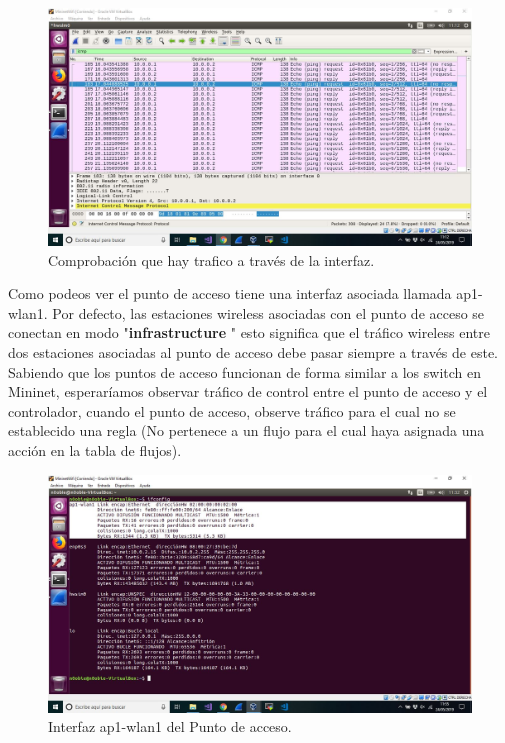 \begin{figure}[!htb]
  \centering
    \includegraphics[width=\linewidth]{./img/test/5.JPG}
    \caption{Comprobación que hay trafico a través de la interfaz.}
  \label{fig:yo}
\end{figure}

Como podeos ver el punto de acceso tiene una interfaz asociada llamada ap1-wlan1. Por defecto, las estaciones wireless asociadas con el punto de acceso se conectan en modo "\textbf{infrastructure} " esto significa que el tráfico wireless entre dos estaciones asociadas al punto de acceso debe pasar siempre a través de este. Sabiendo que los puntos de acceso funcionan de forma similar a los switch en Mininet, esperaríamos observar tráfico de control entre el punto de acceso y el controlador, cuando el punto de acceso,  observe tráfico para el cual no se establecido una regla (No pertenece a un flujo para el cual haya asignada una acción en la tabla de flujos). 

\begin{figure}[!htb]
  \centering
    \includegraphics[width=0.9\linewidth]{./img/test/6.JPG}
    \caption{Interfaz ap1-wlan1 del Punto de acceso.}
  \label{fig:yo}
\end{figure}
\newpage
